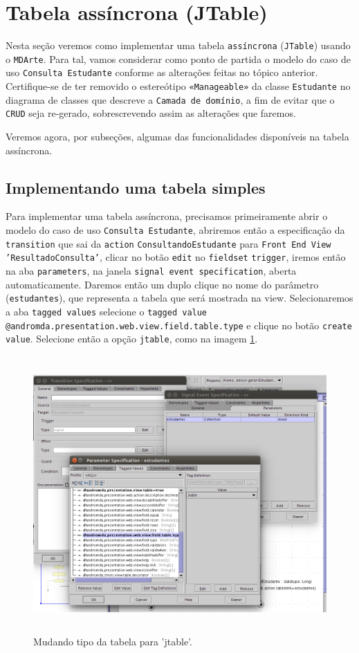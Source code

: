 \section{Tabela assíncrona (JTable)}

Nesta seção veremos como implementar uma tabela \texttt{assíncrona}
(\texttt{JTable}) usando o \texttt{MDArte}. Para tal, vamos considerar como
ponto de partida o modelo do caso de uso \texttt{Consulta Estudante} conforme as
alterações feitas no tópico anterior. Certifique-se de ter removido o
estereótipo \texttt{«Manageable»} da classe \texttt{Estudante} no diagrama de
classes que descreve a \texttt{Camada de domínio}, a fim de evitar que o
\texttt{CRUD} seja re-gerado, sobrescrevendo assim as alterações que faremos.

Veremos agora, por subseções, algumas das funcionalidades disponíveis na tabela
assíncrona.

\subsection{Implementando uma tabela simples}

Para implementar uma tabela assíncrona, precisamos primeiramente abrir o modelo
do caso de uso \texttt{Consulta Estudante}, abriremos então a especificação da
\texttt{transition} que sai da \texttt{action} \texttt{ConsultandoEstudante}
para \texttt{Front End View} \texttt{'ResultadoConsulta'}, clicar no botão
\texttt{edit} no \texttt{fieldset} \texttt{trigger}, iremos então na aba
\texttt{parameters}, na janela \texttt{signal event specification}, aberta
automaticamente. Daremos então um duplo clique no nome do parâmetro
(\texttt{estudantes}), que representa a tabela que será mostrada na view.
Selecionaremos a aba \texttt{tagged values} selecione o \texttt{tagged value}
\texttt{@andromda.presentation.web.view.field.table.type} e clique no botão
\texttt{create value}. Selecione então a opção \texttt{jtable}, como na
imagem \ref{table_type_jtable}.

\begin{figure}[H]
	\centering
	\includegraphics[width=350pt,height=300pt]{files/imgs/tutorial-mdarte-0030.png}
	\caption{Mudando tipo da tabela para 'jtable'.}
	\label{table_type_jtable}
\end{figure}

